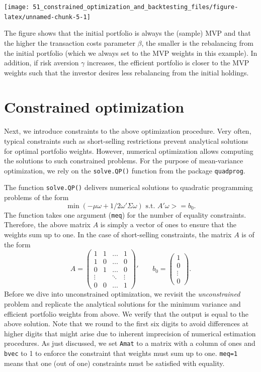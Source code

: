\documentclass[
]{krantz}
\begin{document}
\begin{center}\texttt{[image: 51\_constrained\_optimization\_and\_backtesting\_files/figure-latex/unnamed-chunk-5-1]} \end{center}

The figure shows that the initial portfolio is always the (sample) MVP and that the higher the transaction costs parameter \(\beta\), the smaller is the rebalancing from the initial portfolio (which we always set to the MVP weights in this example). In addition, if risk aversion \(\gamma\) increases, the efficient portfolio is closer to the MVP weights such that the investor desires less rebalancing from the initial holdings.

\hypertarget{constrained-optimization}{%
\section{Constrained optimization}\label{constrained-optimization}}

Next, we introduce constraints to the above optimization procedure. Very often, typical constraints such as short-selling restrictions prevent analytical solutions for optimal portfolio weights. However, numerical optimization allows computing the solutions to such constrained problems. For the purpose of mean-variance optimization, we rely on the \texttt{solve.QP()} function from the package \texttt{quadprog}.

The function \texttt{solve.QP()} delivers numerical solutions to quadratic programming problems of the form
\[\min(-\mu \omega + 1/2 \omega' \Sigma \omega) \text{ s.t. } A' \omega >= b_0.\]
The function takes one argument (\texttt{meq}) for the number of equality constraints. Therefore, the above matrix \(A\) is simply a vector of ones to ensure that the weights sum up to one. In the case of short-selling constraints, the matrix \(A\) is of the form
\[A = \begin{pmatrix}1 & 1& \ldots&1 \\1 & 0 &\ldots&0\\0 & 1 &\ldots&0\\\vdots&&\ddots&\vdots\\0&0&\ldots&1\end{pmatrix}'\qquad b_0 = \begin{pmatrix}1\\0\\\vdots\\0\end{pmatrix}.\]
Before we dive into unconstrained optimization, we revisit the \emph{unconstrained} problem and replicate the analytical solutions for the minimum variance and efficient portfolio weights from above. We verify that the output is equal to the above solution. Note that we round to the first six digits to avoid differences at higher digits that might arise due to inherent imprecision of numerical estimation procedures. As just discussed, we set \texttt{Amat} to a matrix with a column of ones and \texttt{bvec} to 1 to enforce the constraint that weights must sum up to one. \texttt{meq=1} means that one (out of one) constraints must be satisfied with equality.
\end{document}
